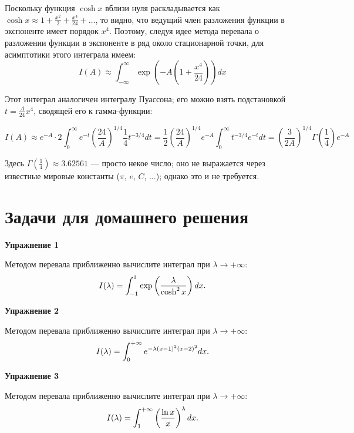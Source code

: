 \documentclass[a4paper,12pt]{article}
\begin{document}
Поскольку функция $\cosh x$ вблизи нуля раскладывается как $\cosh x\approx1+\frac{x^{2}}{2}+\frac{x^{4}}{24}+\dots$,
то видно, что ведущий член разложения функции в экспоненте имеет порядок
$x^{4}$. Поэтому, следуя идее метода перевала о разложении функции
в экспоненте в ряд около стационарной точки, для асимптотики этого
интеграла имеем:
\[
I(A)\approx\int_{-\infty}^{\infty}\exp\left(-A\left(1+\frac{x^{4}}{24}\right)\right)dx
\]

\noindent
Этот интеграл аналогичен интегралу Пуассона; его можно взять подстановкой
$t=\frac{A}{24}x^{4}$, сводящей его к гамма-функции:

\[
I(A)\approx e^{-A}\cdot2\int_{0}^{\infty}e^{-t}\left(\frac{24}{A}\right)^{1/4}\frac{1}{4}t^{-3/4}dt=\frac{1}{2}\left(\frac{24}{A}\right)^{1/4}e^{-A}\int_{0}^{\infty}t^{-3/4}e^{-t}dt=\left(\frac{3}{2A}\right)^{1/4}\Gamma\left(\frac{1}{4}\right)e^{-A}
\]

\noindent
Здесь $\Gamma\left(\frac{1}{4}\right)\approx3.62561$ --- просто некое
число; оно не выражается через известные мировые константы ($\pi$,
$e$, $C$, $\dots$); однако это и не требуется.

\section{Задачи для домашнего решения}

\noindent \textbf{Упражнение 1}

\noindent Методом перевала приближенно вычислите интеграл при $\lambda\rightarrow+\infty$:
\begin{equation}
I(\lambda)=\int_{-1}^{1}\exp\left(\frac{\lambda}{\cosh^{2}x}\right)dx\text{.}	
\notag
\end{equation}

\vspace{15pt}
\noindent \textbf{Упражнение 2}

\noindent Методом перевала приближенно вычислите интеграл при $\lambda\rightarrow+\infty$:
\begin{equation}\notag
I(\lambda)	=\int_{0}^{+\infty}e^{-\lambda(x-1)^{2}(x-2)^{2}}dx.
\end{equation}

\vspace{15pt}
\noindent \textbf{Упражнение 3}

\noindent Методом перевала приближенно вычислите интеграл при $\lambda\rightarrow+\infty$:
\begin{equation}\notag
I(\lambda)=\int_{1}^{+\infty}\left(\frac{\ln x}{x}\right)^{\lambda}dx.	
\end{equation}
\end{document}
